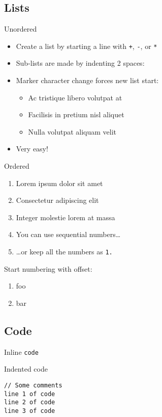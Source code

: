 \documentclass[]{article}
\providecommand{\tightlist}{%
  \setlength{\itemsep}{0pt}\setlength{\parskip}{0pt}}
\begin{document}
\subsection{Lists}\label{lists}

Unordered

\begin{itemize}
\tightlist
\item
  Create a list by starting a line with \texttt{+}, \texttt{-}, or
  \texttt{*}
\item
  Sub-lists are made by indenting 2 spaces:
\item
  Marker character change forces new list start:

  \begin{itemize}
  \tightlist
  \item
    Ac tristique libero volutpat at
  \item
    Facilisis in pretium nisl aliquet
  \item
    Nulla volutpat aliquam velit
  \end{itemize}
\item
  Very easy!
\end{itemize}

Ordered

\begin{enumerate}
\item
  Lorem ipsum dolor sit amet
\item
  Consectetur adipiscing elit
\item
  Integer molestie lorem at massa
\item
  You can use sequential numbers\ldots{}
\item
  \ldots{}or keep all the numbers as \texttt{1.}
\end{enumerate}

Start numbering with offset:

\begin{enumerate}
\tightlist
\item
  foo
\item
  bar
\end{enumerate}

\subsection{Code}\label{code}

Inline \texttt{code}

Indented code

\begin{verbatim}
// Some comments
line 1 of code
line 2 of code
line 3 of code
\end{verbatim}
\end{document}
